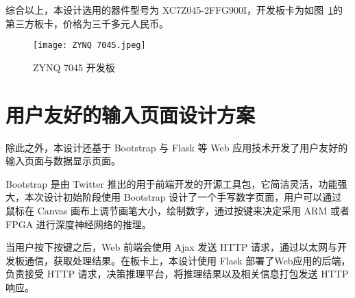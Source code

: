 综合以上，本设计选用的器件型号为 XC7Z045-2FFG900I，开发板卡为如图~\ref{fig:ZYNQ 7045}的第三方板卡，价格为三千多元人民币。

\begin{figure}[!htbp]
    \centering
    \texttt{[image: ZYNQ 7045.jpeg]}
    \caption{ZYNQ 7045 开发板}
    \label{fig:ZYNQ 7045}
\end{figure}

\section{用户友好的输入页面设计方案}

除此之外，本设计还基于 Bootstrap 与 Flask 等 Web 应用技术开发了用户友好的输入页面与数据显示页面。

Bootstrap 是由 Twitter 推出的用于前端开发的开源工具包，它简洁灵活，功能强大，本次设计初始阶段使用 Bootstrap 设计了一个手写数字页面，用户可以通过鼠标在 Canvas 画布上调节画笔大小，绘制数字，通过按键来决定采用 ARM 或者 FPGA 进行深度神经网络的推理。

当用户按下按键之后，Web 前端会使用 Ajax 发送 HTTP 请求，通过以太网与开发板通信，获取处理结果。在板卡上，本设计使用 Flask 部署了Web应用的后端，负责接受 HTTP 请求，决策推理平台，将推理结果以及相关信息打包发送 HTTP 响应。
